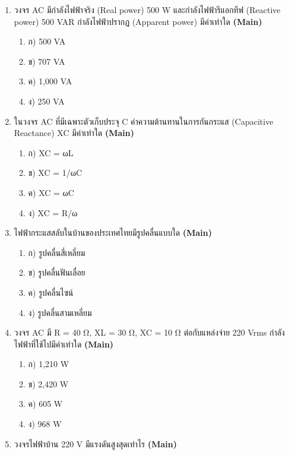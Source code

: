 \documentclass[12pt]{article}
\begin{document}
\begin{enumerate}[label=\arabic*.]
\begin{enumerate}[label=)]
\item ก) สามารถแปลงระดับแรงดันได้ง่ายโดยหม้อแปลง
\item ข) ส่งกำลังไฟฟ้าได้ระยะไกลด้วยแรงดันสูง
\item ค) ใช้งานง่ายในวงจรอิเล็กทรอนิกส์ดิจิทัล
\item ง) การสูญเสียพลังงานในสายส่งต่ำกว่า
\end{enumerate}
\item วงจร AC มีกำลังไฟฟ้าจริง (Real power) 500 W และกำลังไฟฟ้ารีแอกทีฟ (Reactive power) 500 VAR กำลังไฟฟ้าปรากฏ (Apparent power) มีค่าเท่าใด \hfill \textbf{\small (Main)}
\begin{enumerate}[label=)]
\item ก) 500 VA
\item ข) 707 VA
\item ค) 1,000 VA
\item ง) 250 VA
\end{enumerate}
\item ในวงจร AC ที่มีเฉพาะตัวเก็บประจุ C ค่าความต้านทานในการกันกระแส (Capacitive Reactance) XC มีค่าเท่าใด \hfill \textbf{\small (Main)}
\begin{enumerate}[label=)]
\item ก) XC = ωL
\item ข) XC = 1/ωC
\item ค) XC = ωC
\item ง) XC = R/ω
\end{enumerate}
\item ไฟฟ้ากระแสสลับในบ้านของประเทศไทยมีรูปคลื่นแบบใด \hfill \textbf{\small (Main)}
\begin{enumerate}[label=)]
\item ก) รูปคลื่นสี่เหลี่ยม
\item ข) รูปคลื่นฟันเลื่อย
\item ค) รูปคลื่นไซน์
\item ง) รูปคลื่นสามเหลี่ยม
\end{enumerate}
\item วงจร AC มี R = 40 Ω, XL = 30 Ω, XC = 10 Ω ต่อกับแหล่งจ่าย 220 Vrms กำลังไฟฟ้าที่ใช้ไปมีค่าเท่าใด \hfill \textbf{\small (Main)}
\begin{enumerate}[label=)]
\item ก) 1,210 W
\item ข) 2,420 W
\item ค) 605 W
\item ง) 968 W
\end{enumerate}
\item วงจรไฟฟ้าบ้าน 220 V มีแรงดันสูงสุดเท่าไร \hfill \textbf{\small (Main)}

\end{enumerate}
\end{document}
